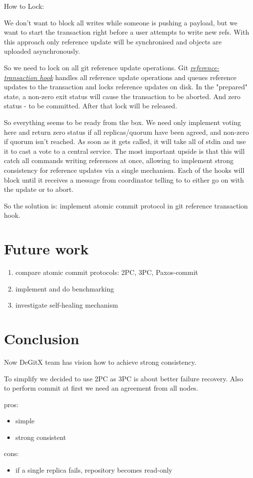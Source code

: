 \documentclass[acmlarge, screen, nonacm]{acmart}
\begin{document}
How to Lock:

We don't want to block all writes while someone is pushing a payload,
but we want to start the transaction right before a user attempts to write new refs.
With this approach only reference update will be synchronised and objects are uploaded asynchronously.

So we need to lock on all git reference update operations.
Git \emph{\href{https://git-scm.com/docs/githooks.html\#_reference_transaction}{reference-transaction hook}}
handles all reference update operations and queues reference updates to the transaction and locks reference updates on disk.
In the "prepared" state, a non-zero exit status will cause the transaction to be aborted.
And zero status - to be committed.
After that lock will be released.

So everything seems to be ready from the box.
We need only implement voting here and return zero status if all replicas/quorum have been agreed, and non-zero if quorum isn't reached.
As soon as it gets called, it will take all
of stdin and use it to cast a vote to a central service.
The most important upside is that this will catch all commands writing
references at once, allowing to implement strong consistency for
reference updates via a single mechanism.
Each of the hooks will block until it receives a message from coordinator telling to to either go on with the update or to abort.

So the solution is: implement atomic commit protocol in git reference transaction hook.

\section{Future work}

\begin{enumerate}
  \item compare atomic commit protocols: 2PC, 3PC, Paxos-commit
  \item implement and do benchmarking
  \item investigate self-healing mechanism
\end{enumerate}

\section{Conclusion}

Now DeGitX team has vision how to achieve strong consistency.

To simplify we decided to use 2PC as 3PC is about better failure recovery.
Also to perform commit at first we need an agreement from all nodes.

pros:
\begin{itemize}
  \item simple
  \item strong consistent
\end{itemize}

cons:
\begin{itemize}
  \item if a single replica fails, repository becomes read-only
\end{itemize}
\end{document}
